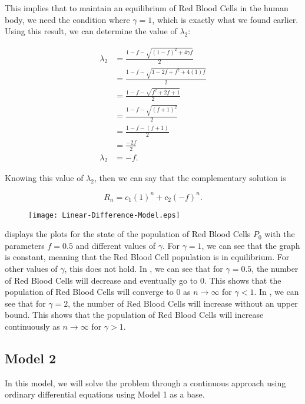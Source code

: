 This implies that to maintain an equilibrium of Red Blood Cells in the human body, we need the condition where $\gamma = 1$, which is exactly what we found earlier. Using this result, we can determine the value of $\lambda_2$:

\begin{align*}
    \lambda_2 &= \frac{1-f - \sqrt{(1-f)^2 + 4\gamma f}}{2}\\
    &= \frac{1-f - \sqrt{1-2f+f^2 + 4(1)f}}{2}\\
    &= \frac{1-f - \sqrt{f^2+2f+1}}{2}\\
    &= \frac{1-f - \sqrt{(f+1)^2}}{2}\\
    &= \frac{1-f - (f+1)}{2}\\
    &= \frac{-2f}{2}\\
    \lambda_2 &= -f.
\end{align*}

Knowing this value of $\lambda_2$, then we can say that the complementary solution is

\begin{equation} \label{eq:7}
    R_n = c_1(1)^n + c_2(-f)^n.
\end{equation}

\begin{figure}[H] 
    \centering
    \texttt{[image: Linear-Difference-Model.eps]}
    \caption{}
    \label{fig:1}
\end{figure}

 displays the plots for the state of the population of Red Blood Cells $P_0$ with the parameters $f=0.5$ and different values of $\gamma$. For $\gamma=1$, we can see that the graph is constant, meaning that the Red Blood Cell population is in equilibrium. For other values of $\gamma$, this does not hold. In , we can see that for $\gamma = 0.5$, the number of Red Blood Cells will decrease and eventually go to 0. This shows that the population of Red Blood Cells will converge to 0 as $n\to\infty$ for $\gamma < 1$. In , we can see that for $\gamma = 2$, the number of Red Blood Cells will increase without an upper bound. This shows that the population of Red Blood Cells will increase continuously as $n\to\infty$ for $\gamma > 1$.

\subsection{Model 2}
\label{subsec:model-2}

In this model, we will solve the problem through a continuous approach using ordinary differential equations using Model 1 as a base.

